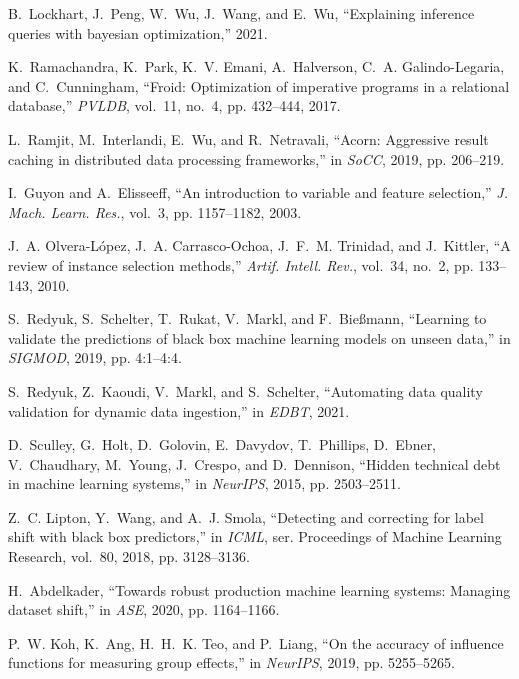 \documentclass[11pt,dvipsnames]{article}
\begin{document}
\begin{thebibliography}{10}
B.~Lockhart, J.~Peng, W.~Wu, J.~Wang, and E.~Wu, ``Explaining inference queries
  with bayesian optimization,'' 2021.

K.~Ramachandra, K.~Park, K.~V. Emani, A.~Halverson, C.~A. Galindo{-}Legaria,
  and C.~Cunningham, ``Froid: Optimization of imperative programs in a
  relational database,'' \emph{PVLDB}, vol.~11, no.~4, pp. 432--444, 2017.

L.~Ramjit, M.~Interlandi, E.~Wu, and R.~Netravali, ``Acorn: Aggressive result
  caching in distributed data processing frameworks,'' in \emph{SoCC}, 2019,
  pp. 206--219.

I.~Guyon and A.~Elisseeff, ``An introduction to variable and feature
  selection,'' \emph{J. Mach. Learn. Res.}, vol.~3, pp. 1157--1182, 2003.

J.~A. Olvera{-}L{\'{o}}pez, J.~A. Carrasco{-}Ochoa, J.~F.~M. Trinidad, and
  J.~Kittler, ``A review of instance selection methods,'' \emph{Artif. Intell.
  Rev.}, vol.~34, no.~2, pp. 133--143, 2010.

S.~Redyuk, S.~Schelter, T.~Rukat, V.~Markl, and F.~Bie{\ss}mann, ``Learning to
  validate the predictions of black box machine learning models on unseen
  data,'' in \emph{SIGMOD}, 2019, pp. 4:1--4:4.

S.~Redyuk, Z.~Kaoudi, V.~Markl, and S.~Schelter, ``Automating data quality
  validation for dynamic data ingestion,'' in \emph{EDBT}, 2021.

D.~Sculley, G.~Holt, D.~Golovin, E.~Davydov, T.~Phillips, D.~Ebner,
  V.~Chaudhary, M.~Young, J.~Crespo, and D.~Dennison, ``Hidden technical debt
  in machine learning systems,'' in \emph{NeurIPS}, 2015, pp. 2503--2511.

Z.~C. Lipton, Y.~Wang, and A.~J. Smola, ``Detecting and correcting for label
  shift with black box predictors,'' in \emph{ICML}, ser. Proceedings of
  Machine Learning Research, vol.~80, 2018, pp. 3128--3136.

H.~Abdelkader, ``Towards robust production machine learning systems: Managing
  dataset shift,'' in \emph{ASE}, 2020, pp. 1164--1166.

P.~W. Koh, K.~Ang, H.~H.~K. Teo, and P.~Liang, ``On the accuracy of influence
  functions for measuring group effects,'' in \emph{NeurIPS}, 2019, pp.
  5255--5265.


\end{thebibliography}
\end{document}
